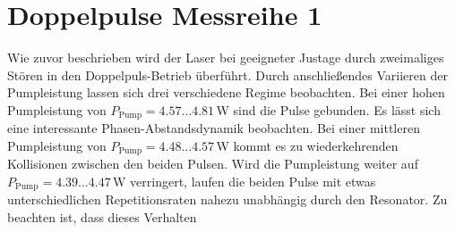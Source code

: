 \documentclass[bachelor,       %
               twoside,        %
               BCOR10mm,       %
               english,ngerman, %
               ]{GAUBM}
\begin{document}
\section{Doppelpulse Messreihe 1}
Wie zuvor beschrieben wird der Laser bei geeigneter Justage durch zweimaliges Stören in den Doppelpuls-Betrieb überführt.
Durch anschließendes Variieren der Pumpleistung lassen sich drei verschiedene Regime beobachten.
Bei einer hohen Pumpleistung von $P_\text{Pump}=4.57\dots 4.81\,$W sind die Pulse gebunden.
Es lässt sich eine interessante Phasen-Abstandsdynamik beobachten.
Bei einer mittleren Pumpleistung von $P_\text{Pump}=4.48\dots 4.57\,$W kommt es zu wiederkehrenden Kollisionen zwischen den beiden Pulsen.
Wird die Pumpleistung weiter auf $P_\text{Pump}=4.39\dots 4.47\,$W verringert, laufen die beiden Pulse mit etwas unterschiedlichen Repetitionsraten nahezu unabhängig durch den Resonator.
Zu beachten ist, dass dieses Verhalten 
\end{document}
